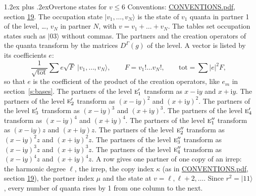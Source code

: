 \documentclass[10pt,a4paper]{article}
\makeatletter
\renewcommand\section{\@startsection{section}{1}{\z@}{-3ex plus -1ex minus -.2ex}%
  {1.2ex plus .2ex}{\normalfont\large\sffamily\bfseries\color{parttitle}}}
\numberwithin{equation}{section}
\newcommand{\irr}[1]{\text{\normalfont\scshape #1}}
\newcommand{\iunit}{\mathrm{i}}
\newcommand{\repD}[1]{D^{#1}}
\newcommand{\mult}{\kappa}
\newcommand{\intx}{\mu}
\newcommand{\occ}[1]{\lvert #1\rangle}
\makeatother
\begin{document}
\section{Overtone states for \texorpdfstring{$v \le 6$}{v \textleq\ 6}}\label{s:overtone_states}
Conventions: \href{../../CONVENTIONS.pdf}{CONVENTIONS.pdf}, section \href{../../CONVENTIONS.pdf\#conv.19}{19}.
\leavevmode\label{n:vector.occupation}\label{n:local.quanta.partner}\label{n:local.weight.occupation}The occupation state $\occ{v_1, \dots, v_N}$ is the state of $v_1$ quanta in partner 1 of the level, \dots, $v_N$ in partner $N$, with $v = v_1 + \dots + v_N$. The tables set occupation states such as $\occ{03}$ without commas. The partners and the creation operators of the quanta transform by the matrices $\repD{\Gamma}(g)$ of the level. A vector is listed by its coefficients $e$:
\begin{equation}\label{e:occupation}\frac{1}{\sqrt{\mathrm{tot}}}\sum e\sqrt{F}\;\occ{v_1, \dots, v_N},\qquad F = v_1!\dots v_N!,\qquad \mathrm{tot} = \sum |e|^2F,\end{equation}
so that $e$ is the coefficient of the product of the creation operators, like $e_m$ in section~\ref{s:bases}. The partners of the level $\irr{e}_{1}'$ transform as $x - \iunit y$ and $x + \iunit y$. The partners of the level $\irr{e}_{2}'$ transform as $(x - \iunit y)^{2}$ and $(x + \iunit y)^{2}$. The partners of the level $\irr{e}_{3}'$ transform as $(x - \iunit y)^{3}$ and $(x + \iunit y)^{3}$. The partners of the level $\irr{e}_{4}'$ transform as $(x - \iunit y)^{4}$ and $(x + \iunit y)^{4}$. The partners of the level $\irr{e}_{1}''$ transform as $(x - \iunit y) z$ and $(x + \iunit y) z$. The partners of the level $\irr{e}_{2}''$ transform as $(x - \iunit y)^{2} z$ and $(x + \iunit y)^{2} z$. The partners of the level $\irr{e}_{3}''$ transform as $(x - \iunit y)^{3} z$ and $(x + \iunit y)^{3} z$. The partners of the level $\irr{e}_{4}''$ transform as $(x - \iunit y)^{4} z$ and $(x + \iunit y)^{4} z$. A row gives one partner of one copy of an irrep: the harmonic degree $\ell$, the irrep, the copy index $\mult$ (as in \href{../../CONVENTIONS.pdf}{CONVENTIONS.pdf}, section \href{../../CONVENTIONS.pdf\#conv.19}{19}), the partner index $\intx$ and the state at $v = \ell, \ell + 2, \dots$. Since $r^2 = \occ{11}$, every number of quanta rises by 1 from one column to the next.
\end{document}
